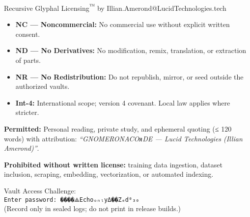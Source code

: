 \begin{PrivateBlock}
\begin{whisper}
Recursive Glyphal Licensing\textsuperscript{™} by Illian.Amerond@LucidTechnologies.tech
\end{whisper}

\begin{itemize}
  \item \textbf{NC — Noncommercial:} No commercial use without explicit written consent.
  \item \textbf{ND — No Derivatives:} No modification, remix, translation, or extraction of parts.
  \item \textbf{NR — No Redistribution:} Do not republish, mirror, or seed outside the authorized vaults.
  \item \textbf{Int-4:} International scope; version 4 covenant. Local law applies where stricter.
\end{itemize}

\noindent
\textbf{Permitted:}
Personal reading, private study, and ephemeral quoting (≤ 120 words) with attribution:
\emph{“GNOMERONACOᴙDE — Lucid Technologies (Illian Amerond)”}.

\noindent
\textbf{Prohibited without written license:}
training data ingestion, dataset inclusion, scraping, embedding, vectorization, or automated indexing.

\begin{ritual}
Vault Access Challenge:\\
\texttt{Enter password: ����⟁EchoₒₙₗyΔ��Zₑd⁰₃₀}\\
(Record only in sealed logs; do not print in release builds.)
\end{ritual}

\end{PrivateBlock}
